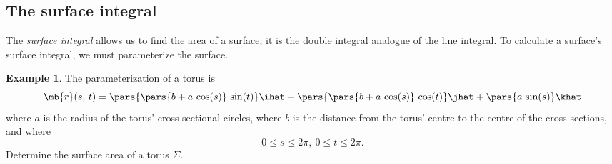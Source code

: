 \documentclass[11pt]{article}
\theoremstyle{definition}
\newtheorem{ex}{Example}[section]
\begin{document}
\subsection{The surface integral}
The \textit{surface integral} allows us to find the area of a surface; it is the double integral analogue of the line integral. To calculate a surface's surface integral, we must parameterize the surface.
\begin{ex}
The parameterization of a torus is
$$
\mb{r}(s,\,t) = \pars{\pars{b +a\,\cos(s)}\,\sin(t)}\ihat + \pars{\pars{b+a\,\cos(s)}\,\cos(t)}\jhat + \pars{a\,\sin(s)}\khat
$$
where $a$ is the radius of the torus' cross-sectional circles, where $b$ is the distance from the torus' centre to the centre of the cross sections, and where
$$
0\leqslant s \leqslant 2 \pi, \  0 \leqslant t\leqslant 2\pi.
$$
Determine the surface area of a torus $\Sigma$. 



\end{ex}
\end{document}
